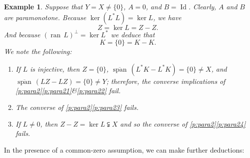 \documentclass{article}
\newcommand{\ran}{\ensuremath{{\operatorname{ran}}\,}}
\newcommand{\cspan}{\ensuremath{\overline{\operatorname{span}}\,}}
\newcommand{\Id}{\ensuremath{\operatorname{Id}}}
\newtheorem{example}[theorem]{Example}
\begin{document}
\begin{example}
\label{ex:241207a}
Suppose that $Y=X\neq\{0\}$, $A=0$, and $B=\Id$.
Clearly, $A$ and $B$ are paramonotone. 
Because $\ker(L^*L)=\ker L$,
we have 
\begin{equation}
\label{e:241207a1}
Z = \ker L = Z-Z.
\end{equation}
And because $(\ran L)^\perp = \ker L^*$ we deduce that 
\begin{equation}
\label{e:241207a2}
K = \{0\} = K-K. 
\end{equation}
We note the following:
\begin{enumerate}
\item If $L$ is injective, then $Z=\{0\}$, 
$\cspan(L^*K-L^*K)=\{0\}\neq X$, and 
$\cspan(LZ-LZ)=\{0\}\neq Y$; therefore,
the converse implications of 
\cref{p:para2}\cref{p:para21}\&\cref{p:para22} fail. 
\item 
The converse of \cref{p:para2}\cref{p:para23} fails. 
\item 
If $L\neq 0$, then $Z-Z=\ker L \subsetneqq X$ and 
so the converse of \cref{p:para2}\cref{p:para24} fails. 
\end{enumerate}
\end{example}



In the presence of a common-zero assumption, we can make further deductions:
\end{document}
